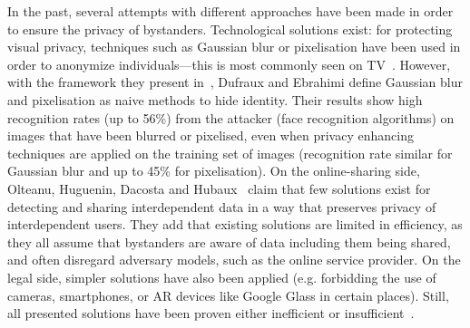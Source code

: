 \documentclass[conference]{IEEEtran}
\begin{document}
In the past, several attempts with different approaches have been made in order to ensure the privacy of bystanders. Technological solutions exist: for protecting visual privacy, techniques such as Gaussian blur or pixelisation have been used in order to anonymize individuals---this is most commonly seen on TV~\cite{dufaux2010framework}. However, with the framework they present in~\cite{dufaux2010framework}, Dufraux and Ebrahimi define Gaussian blur and pixelisation as naive methods to hide identity. Their results show high recognition rates (up to 56\%) from the attacker (face recognition algorithms) on images that have been blurred or pixelised, even when privacy enhancing techniques are applied on the training set of images (recognition rate similar for Gaussian blur and up to 45\% for pixelisation). On the online-sharing side, Olteanu, Huguenin, Dacosta and Hubaux~\cite{olteanu2018consensual} claim that few solutions exist for detecting and sharing interdependent data in a way that preserves privacy of interdependent users. They add that existing solutions are limited in efficiency, as they all assume that bystanders are aware of data including them being shared, and often disregard adversary models, such as the online service provider. On the legal side, simpler solutions have also been applied (e.g. forbidding the use of cameras, smartphones, or \ac{AR} devices like Google Glass in certain places\cite{shu2016cardea}). Still, all presented solutions have been proven either inefficient or insufficient~\cite{shu2016cardea, olteanu2018consensual, dufaux2010framework}. 
\end{document}
